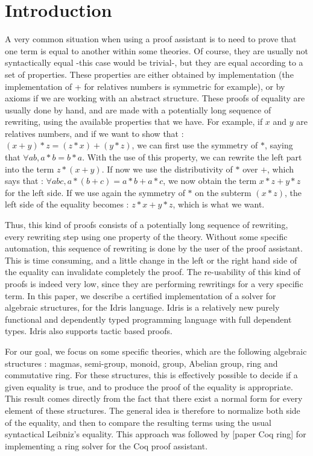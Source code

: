 \section{Introduction}


A very common situation when using a proof assistant is to need to prove that one term is equal to another within some theories. Of course, they are usually not syntactically equal -this case would be trivial-, but they are equal according to a set of properties. These properties are either obtained by implementation (the implementation of + for relatives numbers is symmetric for example), or by axioms if we are working with an abstract structure.
These proofs of equality are usually done by hand, and are made with a potentially long sequence of rewriting, using the available properties that we have. For example, if $x$ and $y$ are relatives numbers, and if we want to show that :
$(x + y) * z = (z * x) + (y * z)$, we can first use the symmetry of $*$, saying that
$\forall a b, a * b = b * a$.
With the use of this property, we can rewrite the left part into the term $z * (x + y)$.
If now we use the distributivity of $*$ over $+$, which says that :
$\forall a b c, a * (b+c) = a*b + a*c$,
we now obtain the term $x*z + y*z$ for the left side.
If we use again the symmetry of $*$ on the subterm $(x*z)$, the left side of the equality becomes : $z*x + y*z$, which is what we want.

Thus, this kind of proofs consists of a potentially long sequence of rewriting, every rewriting step using one property of the theory. Without some specific automation, this sequence of rewriting is done by the user of the proof assistant. This is time consuming, and a little change in the left or the right hand side of the equality can invalidate completely the proof. The re-usability of this kind of proofs is indeed very low, since they are performing rewritings for a very specific term. In this paper, we describe a certified implementation of a solver for algebraic structures, for the Idris language. Idris is a relatively new purely functional and dependently typed programming language with full dependent types. Idris also supports tactic based proofs. 

For our goal, we focus on some specific theories, which are the following algebraic structures : magmas, semi-group, monoid, group, Abelian group, ring and commutative ring.
For these structures, this is effectively possible to decide if a given equality is true, and to produce the proof of the equality is appropriate. This result comes directly from the fact that there exist a normal form for every element of these structures. The general idea is therefore to normalize both side of the equality, and then to compare the resulting terms using the usual syntactical Leibniz's equality.
This approach was followed by [paper Coq ring] for implementing a ring solver for the Coq proof assistant.

